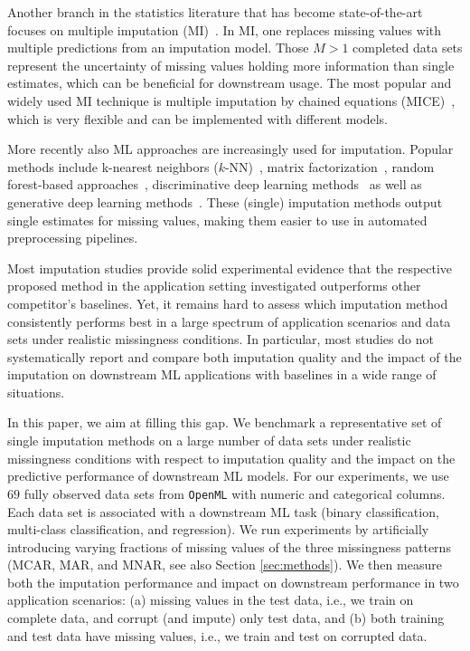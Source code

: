 \documentclass[utf8]{frontiersSCNS} %
\newcommand{\code}[1]{\texttt{#1}}
\begin{document}
Another branch in the statistics literature that has become state-of-the-art focuses on multiple imputation (MI)~\citep{Rubin_MI}. In MI, one replaces missing values with multiple predictions from an imputation model. Those $M > 1$ completed data sets represent the uncertainty of missing values holding more information than single estimates, which can be beneficial for downstream usage. The most popular and widely used MI technique is multiple imputation by chained equations (MICE)~\citep{Little, vanBuuren2018}, which is very flexible and can be implemented with different models.

More recently also ML approaches are increasingly used for imputation. Popular methods include k-nearest neighbors ($k$-NN)~\citep{Batista2003}, matrix factorization~\citep{Troyanskaya2001,Koren2009,Mazumder2010}, random forest-based approaches~\citep{Stekhoven2012}, discriminative deep learning methods~\citep{Biessmann2018a} as well as generative deep learning methods~\citep{GAIN, HIVAE, VAE_for_genomic_data, MisGAN, VIGAN}. These (single) imputation methods output single estimates for missing values, making them easier to use in automated preprocessing pipelines.

Most imputation studies provide solid experimental evidence that the respective proposed method in the application setting investigated outperforms other competitor's baselines. Yet, it remains hard to assess which imputation method consistently performs best in a large spectrum of application scenarios and data sets under realistic missingness conditions. In particular, most studies do not systematically report and compare both imputation quality and the impact of the imputation on downstream ML applications with baselines in a wide range of situations.

In this paper, we aim at filling this gap. We benchmark a representative set of single imputation methods on a large number of data sets under realistic missingness conditions with respect to imputation quality and the impact on the predictive performance of downstream ML models. For our experiments, we use $69$ fully observed data sets from \code{OpenML} \citep{OpenML2013} with numeric and categorical columns. Each data set is associated with a downstream ML task (binary classification, multi-class classification, and regression). We run experiments by artificially introducing varying fractions of missing values of the three missingness patterns (MCAR, MAR, and MNAR, see also Section \ref{sec:methods}). We then measure both the imputation performance and impact on downstream performance in two application scenarios: (a) missing values in the test data, i.e., we train on complete data, and corrupt (and impute) only test data, and (b) both training and test data have missing values, i.e., we train and test on corrupted data.
\end{document}
